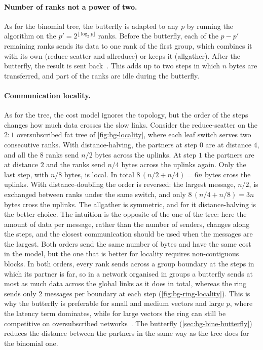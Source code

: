 \paragraph{Number of ranks not a power of two.}
As for the binomial tree, the butterfly is adapted to any $p$ by running the algorithm on the $p'=2^{\lfloor\log_2p\rfloor}$ ranks.
Before the butterfly, each of the $p-p'$ remaining ranks sends its data to one rank of the first group, which combines it with its own (reduce-scatter and allreduce) or keeps it (allgather). After the butterfly, the result is sent back~\cite{thakur2005optimization}.
This adds up to two steps in which $n$ bytes are transferred, and part of the ranks are idle during the butterfly.

\paragraph{Communication locality.}
As for the tree, the cost model ignores the topology, but the order of the steps changes how much data crosses the slow links.
Consider the reduce-scatter on the $2{:}1$ oversubscribed fat tree of \cref{fig:bg-locality}, where each leaf switch serves two consecutive ranks.
With distance-halving, the partners at step $0$ are at distance $4$, and all the $8$ ranks send $n/2$ bytes across the uplinks. At step $1$ the partners are at distance $2$ and the ranks send $n/4$ bytes across the uplinks again. Only the last step, with $n/8$ bytes, is local.
In total $8\,(n/2+n/4)=6n$ bytes cross the uplinks.
With distance-doubling the order is reversed: the largest message, $n/2$, is exchanged between ranks under the same switch, and only $8\,(n/4+n/8)=3n$ bytes cross the uplinks.
The allgather is symmetric, and for it distance-halving is the better choice.
The intuition is the opposite of the one of the tree: here the amount of data per message, rather than the number of senders, changes along the steps, and the closest communication should be used when the messages are the largest.
Both orders send the same number of bytes and have the same cost in the model, but the one that is better for locality requires non-contiguous blocks.
In both orders, every rank sends across a group boundary at the steps in which its partner is far, so in a network organised in groups a butterfly sends at most as much data across the global links as it does in total, whereas the ring sends only $2$ messages per boundary at each step (\cref{fig:bg-ring-locality}).
This is why the butterfly is preferable for small and medium vectors and large $p$, where the latency term dominates, while for large vectors the ring can still be competitive on oversubscribed networks~\cite{desensi2025bine}.
The \bine{} butterfly (\cref{sec:bg-bine-butterfly}) reduces the distance between the partners in the same way as the \bine{} tree does for the binomial one.

